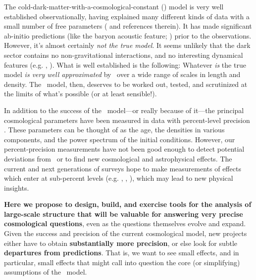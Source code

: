 \documentclass[12pt, fullpage, letterpaper]{article}
\begin{document}
The cold-dark-matter-with-a-cosmological-constant (\LCDM) model \citep{Blumenthal1984} is
very well established observationally, having
explained many different
kinds of data with a small number of free parameters (\citealt{LopezCorredoira2017} and references therein).
It has made significant ab-initio predictions (like the baryon acoustic feature; \citealt{EisensteinHu1998})
prior to the observations.
However, it's almost certainly \emph{not the true model}.
It seems unlikely that the dark sector contains no
non-gravitational interactions, and no interesting dynamical features (e.g. \citealt{Billyard2000}, \citealt{Gonzalez2018}).
What is well established is the following:
Whatever \emph{is} the true model \emph{is very well approximated} by
\LCDM\ over a wide range of scales in length and density.
The \LCDM\ model, then, deserves to be worked out, tested, and scrutinized at the
limits of what's possible (or at least sensible!).

In addition to the success of the \LCDM\ model---or
really because of it---the principal cosmological parameters have been
measured in data with percent-level precision \citep{Planck2018}.
These parameters can be thought of as the age, the densities in
various components, and the power spectrum of the initial conditions.
However, our percent-precision measurements have not been good enough to
detect potential deviations from \LCDM\, or to find new
cosmological and astrophysical effects.
The current and next generations of surveys hope to
make measurements of effects which enter at sub-percent levels (e.g. \citealt{Oyama2016}, \citealt{Rabold2017}, \citealt{Liao2017}),
which may lead to new physical insights.

\textbf{Here we propose to design, build, and exercise tools for the
analysis of large-scale structure that will
  be valuable for answering very precise cosmological questions}, even
as the questions themselves evolve and expand.
Given the success and precision of the current
cosmological model, new projects either have to obtain
\textbf{substantially more precision}, or else look for subtle
\textbf{departures from predictions}.
That is, we want to see small effects, and in particular, small
effects that might call into question the core (or simplifying) assumptions of the
\LCDM\ model.
\end{document}
